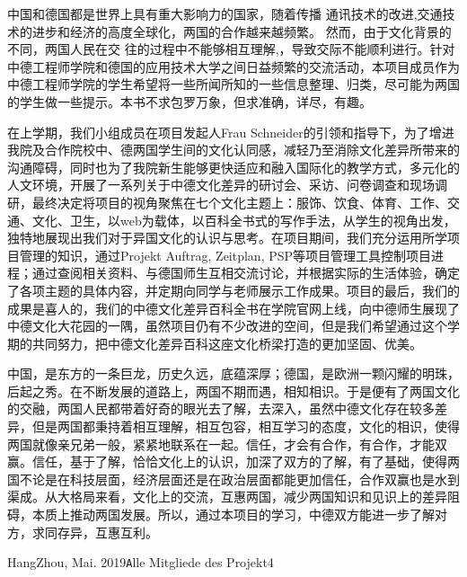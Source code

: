 \normalfont\Huge\sffamily{} \par

\thispagestyle{empty}
 \vspace*{3cm}
 \normalfont\normalsize
 \raggedright
 \indent
 中国和德国都是世界上具有重大影响力的国家，随着传播 通讯技术的改进,交通技术的进步和经济的高度全球化，两国的合作越来越频繁。 然而，由于文化背景的不同，两国人民在交 往的过程中不能够相互理解,，导致交际不能顺利进行。针对中德工程师学院和德国的应用技术大学之间日益频繁的交流活动，本项目成员作为中德工程师学院的学生希望将一些所闻所知的一些信息整理、归类，尽可能为两国的学生做一些提示。本书不求包罗万象，但求准确，详尽，有趣。

\par
 在上学期，我们小组成员在项目发起人Frau Schneider的引领和指导下，为了增进我院及合作院校中、德两国学生间的文化认同感，减轻乃至消除文化差异所带来的沟通障碍，同时也为了我院新生能够更快适应和融入国际化的教学方式，多元化的人文环境，开展了一系列关于中德文化差异的研讨会、采访、问卷调查和现场调研，最终决定将项目的视角聚焦在七个文化主题上：服饰、饮食、体育、工作、交通、文化、卫生，以web为载体，以百科全书式的写作手法，从学生的视角出发，独特地展现出我们对于异国文化的认识与思考。在项目期间，我们充分运用所学项目管理的知识，通过Projekt Auftrag, Zeitplan, PSP等项目管理工具控制项目进程；通过查阅相关资料、与德国师生互相交流讨论，并根据实际的生活体验，确定了各项主题的具体内容，并定期向同学与老师展示工作成果。项目的最后，我们的成果是喜人的，我们的中德文化差异百科全书在学院官网上线，向中德师生展现了中德文化大花园的一隅，虽然项目仍有不少改进的空间，但是我们希望通过这个学期的共同努力，把中德文化差异百科这座文化桥梁打造的更加坚固、优美。
 \par
 中国，是东方的一条巨龙，历史久远，底蕴深厚；德国，是欧洲一颗闪耀的明珠，后起之秀。在不断发展的道路上，两国不期而遇，相知相识。于是便有了两国文化的交融，两国人民都带着好奇的眼光去了解，去深入，虽然中德文化存在较多差异，但是两国都秉持着相互理解，相互包容，相互学习的态度，文化的相识，使得两国就像亲兄弟一般，紧紧地联系在一起。信任，才会有合作，有合作，才能双赢。信任，基于了解，恰恰文化上的认识，加深了双方的了解，有了基础，使得两国不论是在科技层面，经济层面还是在政治层面都能更加信任，合作双赢也是水到渠成。从大格局来看，文化上的交流，互惠两国，减少两国知识和见识上的差异阻碍，本质上推动两国发展。所以，通过本项目的学习，中德双方能进一步了解对方，求同存异，互惠互利。
\vspace{\baselineskip}
\begin{flushright}\noindent
HangZhou, Mai.  2019\hfill {\texttt Alle Mitgliede des Projekt4}\\
\end{flushright}
